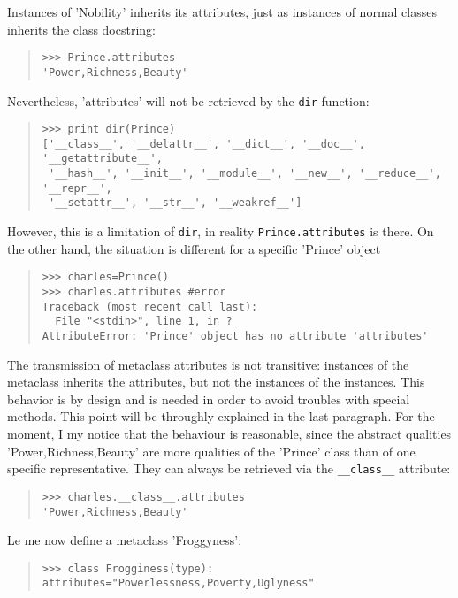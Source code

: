 \documentclass[10pt,english]{article}
\begin{document}
Instances of 'Nobility' inherits its attributes, just as instances of normal
classes inherits the class docstring:
\begin{quote}
\begin{verbatim}>>> Prince.attributes
'Power,Richness,Beauty'\end{verbatim}
\end{quote}

Nevertheless, 'attributes' will not be retrieved by the \texttt{dir} function:
\begin{quote}
\begin{verbatim}>>> print dir(Prince)
['__class__', '__delattr__', '__dict__', '__doc__', '__getattribute__', 
 '__hash__', '__init__', '__module__', '__new__', '__reduce__', '__repr__', 
 '__setattr__', '__str__', '__weakref__']\end{verbatim}
\end{quote}

However, this is a limitation of \texttt{dir}, in reality \texttt{Prince.attributes}
is there. On the other hand, the situation is different for a specific 
'Prince' object
\begin{quote}
\begin{verbatim}>>> charles=Prince()
>>> charles.attributes #error
Traceback (most recent call last):
  File "<stdin>", line 1, in ?
AttributeError: 'Prince' object has no attribute 'attributes'\end{verbatim}
\end{quote}

The transmission of metaclass attributes is not transitive:
instances of the metaclass inherits the attributes, but not the instances 
of the instances. This behavior is by design and is needed in order to avoid 
troubles with special methods. This point will be throughly 
explained in the last paragraph. For the moment, I my notice that the
behaviour is reasonable, since the abstract qualities  'Power,Richness,Beauty'
are more qualities of the 'Prince' class than of one specific representative.
They can always be retrieved via the \texttt{{\_}{\_}class{\_}{\_}} attribute:
\begin{quote}
\begin{verbatim}>>> charles.__class__.attributes
'Power,Richness,Beauty'\end{verbatim}
\end{quote}

Le me now define a metaclass 'Froggyness':
\begin{quote}
\begin{verbatim}>>> class Frogginess(type): attributes="Powerlessness,Poverty,Uglyness"\end{verbatim}
\end{quote}
\end{document}
